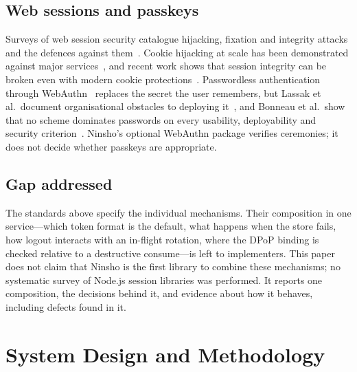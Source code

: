 \documentclass[conference]{IEEEtran}
\begin{document}
\subsection{Web sessions and passkeys}
Surveys of web session security catalogue hijacking, fixation and integrity attacks and the defences against them~\cite{calzavara2017surviving}. Cookie hijacking at scale has been demonstrated against major services~\cite{sivakorn2016cookie}, and recent work shows that session integrity can be broken even with modern cookie protections~\cite{squarcina2023cookie}. Passwordless authentication through WebAuthn~\cite{webauthn3} replaces the secret the user remembers, but Lassak et al.\ document organisational obstacles to deploying it~\cite{lassak2024passkeys}, and Bonneau et al.\ show that no scheme dominates passwords on every usability, deployability and security criterion~\cite{bonneau2012quest}. Ninsho's optional WebAuthn package verifies ceremonies; it does not decide whether passkeys are appropriate.

\subsection{Gap addressed}
The standards above specify the individual mechanisms. Their composition in one service---which token format is the default, what happens when the store fails, how logout interacts with an in-flight rotation, where the DPoP binding is checked relative to a destructive consume---is left to implementers. This paper does not claim that Ninsho is the first library to combine these mechanisms; no systematic survey of Node.js session libraries was performed. It reports one composition, the decisions behind it, and evidence about how it behaves, including defects found in it.

\section{System Design and Methodology}
\label{sec:design}
\end{document}
